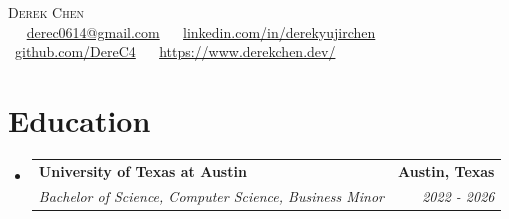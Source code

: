 \documentclass[letterpaper,11pt]{article}
\makeatletter
\newcommand{\resumeSubheading}[4]{
  \vspace{-2pt}\item
    \begin{tabular*}{1.0\textwidth}[t]{l@{\extracolsep{\fill}}r}
      \textbf{#1} & \textbf{\small #2} \\
      \textit{\small#3} & \textit{\small #4} \\
    \end{tabular*}\vspace{-7pt}
}
\newcommand{\resumeSubHeadingListStart}{\begin{itemize}[leftmargin=0.0in, label={}]}
\newcommand{\resumeSubHeadingListEnd}{\end{itemize}}
\makeatother
\begin{document}

\begin{center}
	{\LARGE \scshape Derek Chen} \\ \vspace{1pt} 
	\small \raisebox{-0.1\height}~ \raisebox{-0.2\height}\faEnvelope\ \href{mailto:derec0614@gmail.com}{derec0614@gmail.com} ~ 
	\raisebox{-0.2\height}\faLinkedin\ \href{https://www.linkedin.com/in/derekyujirchen}{linkedin.com/in/derekyujirchen} ~
	\raisebox{-0.2\height}\faGithub\ \href{https://github.com/DereC4}{github.com/DereC4} ~
    \raisebox{-0.2\height}\faCode\ \href{https://derekchen.dev}{https://www.derekchen.dev/}
	\vspace{-8pt}
\end{center}


\section{Education}
\resumeSubHeadingListStart
\resumeSubheading
{University of Texas at Austin}{Austin, Texas}
{Bachelor of Science, Computer Science, Business Minor}{2022 - 2026}
\resumeSubHeadingListEnd
\end{document}
